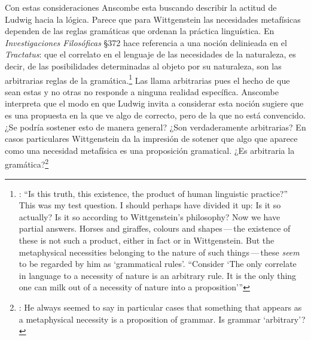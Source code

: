 Con estas consideraciones Anscombe esta buscando describir la actitud de Ludwig hacia la lógica. Parece que para Wittgenstein las necesidades metafísicas dependen de las reglas gramáticas que ordenan la práctica linguística. En \emph{Investigaciones Filosóficas} \S372 hace referencia a una noción delinieada en el \emph{Tractatus}: que el correlato en el lenguaje de las necesidades de la naturaleza, es decir, de las posibilidades determinadas al objeto por su naturaleza, son las arbitrarias reglas de la gramática.\footnote{\cite[Cf.~][121]{anscombe1981parmenides:qli}: ``Is this truth, this existence, the product of human linguistic practice?'' This was my test question. I should perhaps have divided it up: Is it so actually? Is it so according to Wittgenstein's philosophy? Now we have partial answers. Horses and giraffes, colours and shapes\,---\,the existence of these is not such a product, either in fact or in Wittgenstein. But the metaphysical necessities belonging to the nature of such things\,---\,these \emph{seem} to be regarded by him as `grammatical rules'. ``Consider `The only correlate in language to a necessity of nature is an arbitrary rule. It is the only thing one can milk out of a necessity of nature into a proposition'''} Las llama arbitrarias pues el hecho de que sean estas y no otras no responde a ninguna realidad específica. Anscombe interpreta que el modo en que Ludwig invita a considerar esta noción sugiere que es una propuesta en la que ve algo de correcto, pero de la que no está convencido. ¿Se podría sostener esto de manera general? ¿Son verdaderamente arbitrarias? En casos particulares Wittgenstein da la impresión de sotener que algo que aparece como una necesidad metafísica es una proposición gramatical. ¿Es arbitraria la gramática?\footnote{\cite[Cf.~][122]{anscombe1981parmenides:qli}: He always seemed to say in particular cases that something that appears as a metaphysical necessity is a proposition of grammar. Is grammar `arbitrary'?}

